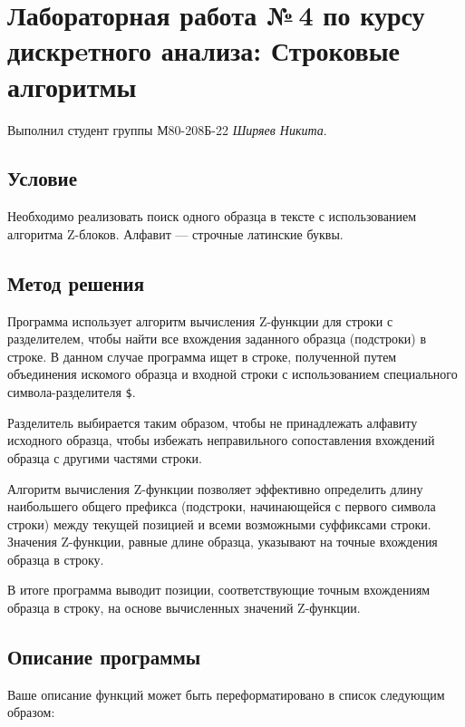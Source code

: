 \documentclass[12pt]{article}
\begin{document}
\section*{Лабораторная работа №\,4 по курсу дискрeтного анализа: Строковые алгоритмы}
Выполнил студент группы М80-208Б-22 \textit{Ширяев Никита}.

\subsection*{Условие}

Необходимо реализовать поиск одного образца в тексте с использованием алгоритма Z-блоков. Алфавит — строчные латинские буквы. 

\subsection*{Метод решения}

Программа использует алгоритм вычисления Z-функции для строки с разделителем, чтобы найти все вхождения заданного образца (подстроки) в строке. В данном случае программа ищет в строке, полученной путем объединения искомого образца и входной строки с использованием специального символа-разделителя \texttt{\$}.

Разделитель выбирается таким образом, чтобы не принадлежать алфавиту исходного образца, чтобы избежать неправильного сопоставления вхождений образца с другими частями строки.

Алгоритм вычисления Z-функции позволяет эффективно определить длину наибольшего общего префикса (подстроки, начинающейся с первого символа строки) между текущей позицией и всеми возможными суффиксами строки. Значения Z-функции, равные длине образца, указывают на точные вхождения образца в строку.

В итоге программа выводит позиции, соответствующие точным вхождениям образца в строку, на основе вычисленных значений Z-функции.

\subsection*{Описание программы}

Ваше описание функций может быть переформатировано в список следующим образом:
\end{document}
